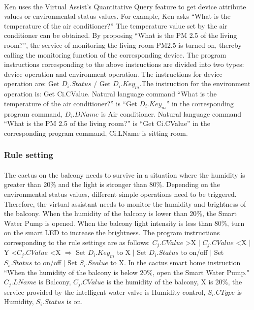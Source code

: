 \paragraph{}
Ken uses the Virtual Assist's Quantitative Query feature to get device attribute values or environmental status values. For example, Ken asks “What is the temperature of the air conditioner?” The temperature value set by the air conditioner can be obtained. By proposing “What is the PM 2.5 of the living room?”, the service of monitoring the living room PM2.5 is turned on, thereby calling the monitoring function of the corresponding device. The program instructions corresponding to the above instructions are divided into two types: device operation and environment operation. The instructions for device operation are: Get $D_{i}.Status$ / Get $D_{i}.Key_{m}$.The instruction for the environment operation is: Get Ci.CValue. Natural language command “What is the temperature of the air conditioner?”  is “Get $D_{i}.Key_{m}$” in the corresponding program command, $D_{i}.DName$ is Air conditioner. Natural language command “What is the PM 2.5 of the living room?” is “Get Ci.CValue” in the corresponding program command, Ci.LName is sitting room.

\subsubsection{Rule setting}
\paragraph{}
The cactus on the balcony needs to survive in a situation where the humidity is greater than 20\% and the light is stronger than 80\%. Depending on the environmental status values, different simple operations need to be triggered. Therefore, the virtual assistant needs to monitor the humidity and brightness of the balcony. When the humidity of the balcony is lower than 20\%, the Smart Water Pump is opened. When the balcony light intensity is less than 80\%, turn on the smart LED to increase the brightness. The program instructions corresponding to the rule settings are as follows: $C_{j}.CValue$ \textgreater X $\mid$  $C_{j}.CValue$ \textless X $\mid$  Y \textless $C_{j}.CValue$ \textless X $\Rightarrow$ Set $D_{i}.Key_{m}$ to X $\mid$  Set $ D_{i}.Status$ to on/off $\mid$ Set $S_{i}.Status$ to on/off $\mid$ Set $S_{i}.Svalue$ to X. In the cactus smart home instruction ``When the humidity of the balcony is below 20\%, open the Smart Water Pump." $C_{j}.LName$ is Balcony, $C_{j}.CValue$ is the humidity of the balcony, X is 20\%, the service provided by the intelligent water valve is Humidity control, $S_{i}.CType$ is Humidity, $S_{i}.Status$ is on.

